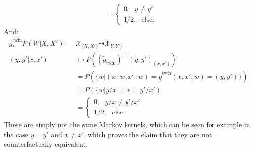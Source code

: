 \begin{enumerate}
\begin{ungradedsolution}
\begin{enumerate}
\begin{align*}
				                                     & = \begin{cases} 0, \ \ \ y \neq y' \\ 1/2, \ \ \ \text{else}.\end{cases}
			\end{align*}
			And:
			\begin{align*}
				\tilde{g}^{\text{twin}}_* P(W | X, X'): \ \  & \mathcal{X}_{\{X,X'\}} \dashrightarrow \mathcal{X}_{Y,Y'\}}                                   \\
				(y, y' | x, x')                              & \mapsto P\left((\tilde{g}_{\text{twin}})^{-1}(y,y')_{(x,x')}\right)                           \\
				                                             & = P\left(\{w | (x \cdot w, x' \cdot w) = \tilde{g}^{\text{twin}}(x, x', w) = (y, y')\}\right) \\
				                                             & = P\left(\{w | y/x = w = y'/x'\right)                                                         \\
				                                             & = \begin{cases} 0, \ \ \ y/x \neq y'/x' \\ 1/2, \ \ \ \text{else}.\end{cases}
			\end{align*}
			These are simply not the same Markov kernels, which can be seen for example in the case $y = y'$ and $x \neq x'$, which proves the claim that they are not counterfactually equivalent.


\end{enumerate}
\end{ungradedsolution}
\end{enumerate}
